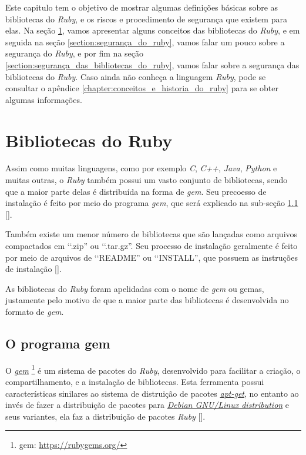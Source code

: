 Este capitulo tem o objetivo de mostrar algumas definições básicas sobre as bibliotecas do
\emph{Ruby}, e os riscos e procedimento de segurança que existem para elas.
Na seção \ref{section:bibliotecas_do_ruby}, vamos apresentar alguns conceitos das bibliotecas do
\emph{Ruby}, e em seguida na seção \ref{section:segurança_do_ruby}, vamos falar um pouco
sobre a segurança do \emph{Ruby}, e por fim na seção \ref{section:segurança_das_bibliotecas_do_ruby},
vamos falar sobre a segurança das bibliotecas do \emph{Ruby}. Caso ainda não conheça a linguagem
\emph{Ruby}, pode se consultar o apêndice \ref{chapter:conceitos_e_historia_do_ruby} para se obter
algumas informações.

\section{Bibliotecas do Ruby}
\label{section:bibliotecas_do_ruby}

Assim como muitas linguagens, como por exemplo \emph{C}, \emph{C++}, \emph{Java}, \emph{Python} e muitas
outras, o \emph{Ruby} também possui um vasto conjunto de bibliotecas, sendo que a maior parte
delas é distribuída na forma de \emph{gem}. Seu precoesso de instalação é feito por meio do programa
\emph{gem}, que será explicado na sub-seção \ref{subsection:o_programa_gem} [].

Também existe um menor número de bibliotecas que são lançadas como arquivos compactados em ‘‘.zip''
ou ‘‘.tar.gz''. Seu processo de instalação geralmente é feito por meio de arquivos de ‘‘README''
ou ‘‘INSTALL'', que possuem as instruções de instalação [].

As bibliotecas do \emph{Ruby} foram apelidadas com o nome de \emph{gem} ou gemas, justamente pelo
motivo de que a maior parte das bibliotecas é desenvolvida no formato de \emph{gem}.

\subsection{O programa gem}
\label{subsection:o_programa_gem}

O \emph{\href{https://rubygems.org/}{gem}} \footnote{gem: \url{https://rubygems.org/}} é um sistema
de pacotes do \emph{Ruby}, desenvolvido para facilitar a criação, o compartilhamento, e a instalação de
bibliotecas. Esta ferramenta possui características sinilares ao sistema de distruição de pacotes
\emph{\href{https://packages.qa.debian.org/a/apt.html}{apt-get}}, no entanto ao invés de fazer a distribuição
de pacotes para \emph{\href{https://www.debian.org/}{Debian GNU/Linux distribution}} e seus variantes, ela faz
a distribuição de pacotes \emph{Ruby} [].

